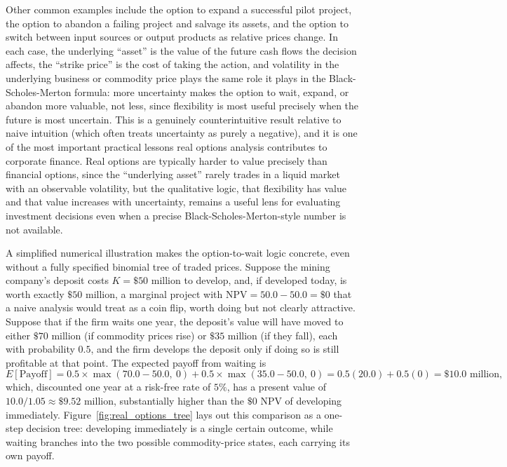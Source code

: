 \documentclass[../ai_in_finance]{subfiles}
\begin{document}
Other common examples include the option to expand a successful pilot project, the option to abandon a failing project and salvage its assets, and the option to switch
between input sources or output products as relative prices change. In each case, the underlying ``asset'' is the value of the future cash flows the decision affects,
the ``strike price'' is the cost of taking the action, and volatility in the underlying business or commodity price plays the same role it plays in the
Black-Scholes-Merton formula: more uncertainty makes the option to wait, expand, or abandon more valuable, not less, since flexibility is most useful precisely when
the future is most uncertain. This is a genuinely counterintuitive result relative to naive intuition (which often treats uncertainty as purely a negative), and it is
one of the most important practical lessons real options analysis contributes to corporate finance. Real options are typically harder to value precisely than financial
options, since the ``underlying asset'' rarely trades in a liquid market with an observable volatility, but the qualitative logic, that flexibility has value and that
value increases with uncertainty, remains a useful lens for evaluating investment decisions even when a precise Black-Scholes-Merton-style number is not available.

A simplified numerical illustration makes the option-to-wait logic concrete, even without a fully specified binomial tree of traded prices. Suppose the mining company's deposit costs $K = \$50$ million to develop, and, if developed today, is worth exactly $\$50$ million, a marginal project with $\text{NPV} = 50.0 - 50.0 = \$0$ that a naive analysis would treat as a coin flip, worth doing but not clearly attractive. Suppose that if the firm waits one year, the deposit's value will have moved to either $\$70$ million (if commodity prices rise) or $\$35$ million (if they fall), each with probability $0.5$, and the firm develops the deposit only if doing so is still profitable at that point.
The expected payoff from waiting is
\begin{equation*}
E[\text{Payoff}] = 0.5 \times \max(70.0 - 50.0,\ 0) + 0.5 \times \max(35.0 - 50.0,\ 0) = 0.5(20.0) + 0.5(0) = \$10.0 \text{ million},
\end{equation*}
which, discounted one year at a risk-free rate of $5\%$, has a present value of $10.0/1.05 \approx \$9.52$ million, substantially higher than the $\$0$ NPV of developing immediately. Figure~\ref{fig:real_options_tree} lays out this comparison as a one-step decision tree: developing immediately is a single certain outcome, while waiting branches into the two possible commodity-price states, each carrying its own payoff.
\end{document}
